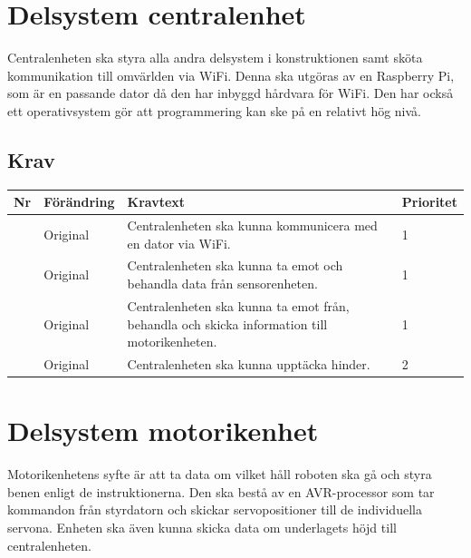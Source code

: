 \documentclass[a4paper,titlepage,12pt]{article}
\newcounter{reqNr}
\newcommand{\nextReqNr}{\stepcounter{reqNr}\arabic{reqNr}}
\begin{document}
	\section{Delsystem centralenhet}
	Centralenheten ska styra alla andra delsystem i konstruktionen samt sköta
	kommunikation till omvärlden via WiFi. Denna ska utgöras av en Raspberry
	Pi, som är en passande dator då den har inbyggd hårdvara för WiFi. Den har 
	också ett operativsystem gör att programmering kan ske på en relativt hög nivå.

	\newpage

	\subsection{Krav}
	\begin{table}[h]
		\label{tab:Krav centralenhet}
		\begin{tabularx}{\textwidth}{|c|l|X|l|}
			\hline
			\textbf{Nr} & \textbf{Förändring} & \textbf{Kravtext} & \textbf{Prioritet} 
				\\ \hline

			\nextReqNr & Original & Centralenheten ska kunna kommunicera 
				med en dator via WiFi. & 1
				\\ \hline

			\nextReqNr & Original & Centralenheten ska kunna ta emot och 
				behandla data från sensorenheten.& 1
				\\ \hline

			\nextReqNr & Original & Centralenheten ska kunna ta emot från, 
				behandla och skicka information till motorikenheten. & 1
				\\ \hline

			\nextReqNr & Original & Centralenheten ska kunna upptäcka hinder. & 2
			\\ \hline

		\end{tabularx}
	\end{table}




	\section{Delsystem motorikenhet}
	Motorikenhetens syfte är att ta data om vilket håll roboten ska gå och styra benen enligt de
	instruktionerna. Den ska bestå av en AVR-processor som tar kommandon från styrdatorn och skickar
	servopositioner till de individuella servona. Enheten ska även kunna skicka data om underlagets
	höjd till centralenheten.
\end{document}
